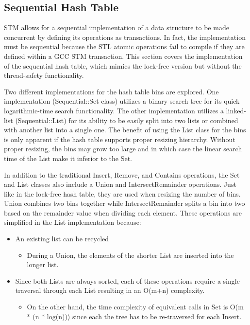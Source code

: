 \documentclass[11pt]{article} %
\begin{document}
\subsection{Sequential Hash Table}

STM allows for a sequential implementation of a data structure to be made concurrent by defining its operations as transactions. In fact, the implementation must be sequential because the STL atomic operations fail to compile if they are defined within a GCC STM transaction. This section covers the implementation of the sequential hash table, which mimics the lock-free version but without the thread-safety functionality.

Two different implementations for the hash table bins are explored. One implementation (Sequential::Set class) utilizes a binary search tree for its quick logarithmic-time search functionality. The other implementation utilizes a linked-list (Sequential::List) for its ability to be easily split into two lists or combined with another list into a single one. The benefit of using the List class for the bins is only apparent if the hash table supports proper resizing hierarchy. Without proper resizing, the bins may grow too large and in which case the linear search time of the List make it inferior to the Set.

In addition to the traditional Insert, Remove, and Contains operations, the Set and List classes also include a Union and IntersectRemainder operations. Just like in the lock-free hash table, they are used when resizing the number of bins. Union combines two bins together while IntersectRemainder splits a bin into two based on the remainder value when dividing each element. These operations are simplified in the List implementation because:

\begin{itemize}
	\item An existing list can be recycled
	\begin{itemize}
		\item During a Union, the elements of the shorter List are inserted into the longer list.
	\end{itemize}
	\item Since both Lists are always sorted, each of these operations require a single traversal through each List resulting in an O(m+n) complexity.
	\begin{itemize}
		\item On the other hand, the time complexity of equivalent calls in Set is O(m * (n * log(n))) since each the tree has to be re-traversed for each Insert.
	\end{itemize}
\end{itemize}
\end{document}

